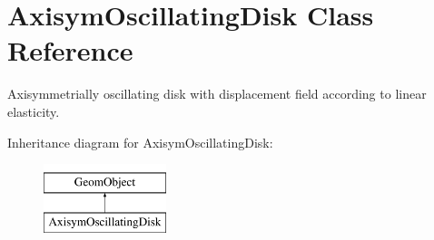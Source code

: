 \hypertarget{classAxisymOscillatingDisk}{}\section{Axisym\+Oscillating\+Disk Class Reference}
\label{classAxisymOscillatingDisk}


Axisymmetrially oscillating disk with displacement field according to linear elasticity.  


Inheritance diagram for Axisym\+Oscillating\+Disk\+:\begin{figure}[H]
\begin{center}
\leavevmode
\includegraphics[height=2.000000cm]{classAxisymOscillatingDisk}
\end{center}
\end{figure}
